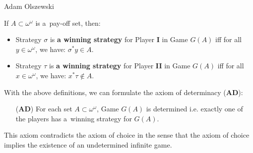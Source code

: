\begin{artengenv}{Adam Olszewski}
%
%
%
%
%
%
%
%
%
%
%
%
%
%
%

If $A \subset \omega^{\omega}$ is a~pay-off set, then:
\begin{itemize}
\item Strategy $\sigma$ is \textbf{a winning strategy} for Player \textbf{I} in Game $G(A)$ iff for all $y\in\omega^{\omega}$, we have: $\sigma^*y \in A$.
\item Strategy $\tau$ is \textbf{a winning strategy} for Player \textbf{II} in Game $G(A)$ iff for all $x\in \omega^{\omega}$, we have: $x^*\tau \not\in A$.
\end{itemize}
With the above definitions, we can formulate the axiom of determinacy (\textbf{AD}):
\begin{itemize}
\item[(\textbf{AD})] For each set $A\subset \omega^{\omega}$, Game $G(A)$ is determined i.e. exactly one of the players has a~winning strategy for $G(A)$.\qedsymbol
\end{itemize}
This axiom contradicts the axiom of choice in the sense that the axiom of choice implies the existence of an undetermined infinite game.


\end{artengenv}
